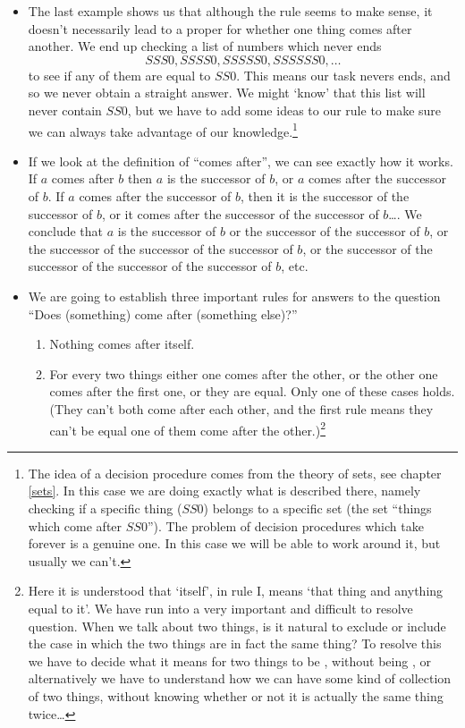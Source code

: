 \begin{itemize}
\begin{enumerate}[i]
\end{enumerate}
\item
The last example shows us that although the rule seems to make sense, it doesn't necessarily lead to a proper  for whether one thing comes after another. We end up checking a list of numbers which never ends
\[ SSS0, SSSS0, SSSSS0, SSSSSS0, \ldots \]
to see if any of them are equal to $SS0$. This means our task nevers ends, and so we never obtain a straight answer. We might `know' that this list will never contain $SS0$, but we have to add some ideas to our rule to make sure we can always take advantage of our knowledge.\footnote{The idea of a decision procedure comes from the theory of sets, see chapter \ref{sets}. In this case we are doing exactly what is described there, namely checking if a specific thing ($SS0$) belongs to a specific set (the set ``things which come after $SS0$''). The problem of decision procedures which take forever is a genuine one. In this case we will be able to work around it, but usually we can't.}
\item
If we look at the definition of ``comes after'', we can see exactly how it works. If $a$ comes after $b$ then $a$ is the successor of $b$, or $a$ comes after the successor of $b$. If $a$ comes after the successor of $b$, then it is the successor of the successor of $b$, or it comes after the successor of the successor of $b$\ldots. We conclude that $a$ is the successor of $b$ or the successor of the successor of $b$, or the successor of the successor of the successor of $b$, or the successor of the successor of the successor of the successor of $b$, etc.
\item
We are going to establish three important rules for answers to the question ``Does (something) come after (something else)?''
\begin{enumerate}[I]
\item
Nothing comes after itself.
\item
For every two things either one comes after the other, or the other one comes after the first one, or they are equal. Only one of these cases holds. (They can't both come after each other, and the first rule means they can't be equal  one of them come after the other.)\footnote{Here it is understood that `itself', in rule I, means `that thing and anything equal to it'. We have run into a very important and difficult to resolve question. When we talk about two things, is it natural to exclude or include the case in which the two things are in fact the same thing? To resolve this we have to decide what it means for two things to be , without being , or alternatively we have to understand how we can have some kind of collection of two things, without knowing whether or not it is actually the same thing twice\ldots}

\end{enumerate}
\end{itemize}
